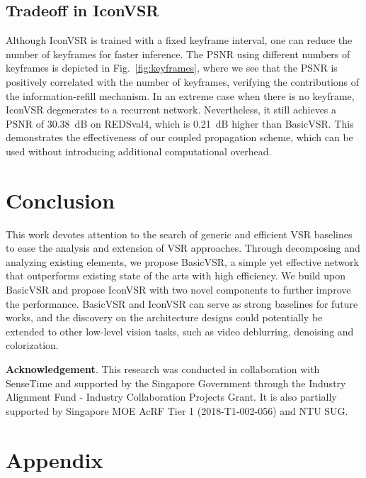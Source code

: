 \documentclass[final]{cvpr}
\begin{document}
\subsection{Tradeoff in \mbox{IconVSR}}
Although \mbox{IconVSR} is trained with a fixed keyframe interval, one can reduce the number of keyframes for faster inference. The PSNR using different numbers of keyframes is depicted in Fig.~\ref{fig:keyframes}, where we see that the PSNR is positively correlated with the number of keyframes, verifying the contributions of the information-refill mechanism.
In an extreme case when there is no keyframe, \mbox{IconVSR} degenerates to a recurrent network. Nevertheless, it still achieves a PSNR of 30.38~dB on REDSval4, which is 0.21~dB higher than \mbox{BasicVSR}. This demonstrates the effectiveness of our coupled propagation scheme, which can be used without introducing additional computational overhead.
 \vspace{-0.15cm}
\section{Conclusion}
This work devotes attention to the search of generic and efficient VSR baselines to ease the analysis and extension of VSR approaches. Through decomposing and analyzing existing elements, we propose \mbox{BasicVSR}, a simple yet effective network that outperforms existing state of the arts with high efficiency. We build upon \mbox{BasicVSR} and propose \mbox{IconVSR} with two novel components to further improve the performance. \mbox{BasicVSR} and \mbox{IconVSR} can serve as strong baselines for future works, and the discovery on the architecture designs could potentially be extended to other low-level vision tasks, such as video deblurring, denoising and colorization.

\vspace{0.2cm}
\noindent\textbf{Acknowledgement}.
This research was conducted in collaboration with SenseTime and supported by the Singapore Government through the Industry Alignment Fund - Industry Collaboration Projects Grant. It is also partially supported by Singapore MOE AcRF Tier 1 (2018-T1-002-056) and NTU SUG.
 \clearpage
{\small
	
	
}
\appendix
\section*{Appendix}
\label{appendix}
\end{document}
